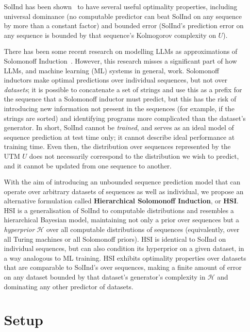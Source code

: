 \documentclass[11pt]{article}
\newcommand{\Eta}{\mathcal{H}}
\begin{document}
SolInd has been shown~\citep{Hutter2001a} to have several useful optimality properties, including universal dominance (no computable predictor can beat SolInd on any sequence by more than a constant factor) and bounded error (SolInd's prediction error on any sequence is bounded by that sequence's Kolmogorov complexity on $U$).

There has been some recent research on modelling LLMs as approximations of Solomonoff Induction~\citep{Young2025, Wan2024}.
However, this research misses a significant part of how LLMs, and machine learning (ML) systems in general, work.
Solomonoff inductors make optimal predictions over individual sequences, but not over \textit{datasets}; it is possible to concatenate a set of strings and use this as a prefix for the sequence that a Solomonoff inductor must predict, but this has the risk of introducing new information not present in the sequences (for example, if the strings are sorted) and identifying programs more complicated than the dataset's generator.
In short, SolInd cannot be \textit{trained}, and serves as an ideal model of sequence prediction at test time only; it cannot describe ideal performance at training time.
Even then, the distribution over sequences represented by the UTM $U$ does not necessarily correspond to the distribution we wish to predict, and it cannot be updated from one sequence to another.


With the aim of introducing an unbounded sequence prediction model that can operate over arbitrary datasets of sequences as well as individual, we propose an alternative formulation called \textbf{Hierarchical Solomonoff Induction}, or \textbf{HSI}.
HSI is a generalisation of SolInd to computable distributions and resembles a hierarchical Bayesian model, maintaining not only a prior over sequences but a \textit{hyperprior} $\Eta$ over all computable distributions of sequences (equivalently, over all Turing machines or all Solomonoff priors).
HSI is identical to SolInd on individual sequences, but can also condition its hyperprior on a given dataset, in a way analogous to ML training.
HSI exhibits optimality properties over datasets that are comparable to SolInd's over sequences, making a finite amount of error on any dataset bounded by that dataset's generator's complexity in $\Eta$ and dominating any other predictor of datasets.


\section{Setup}
\end{document}
